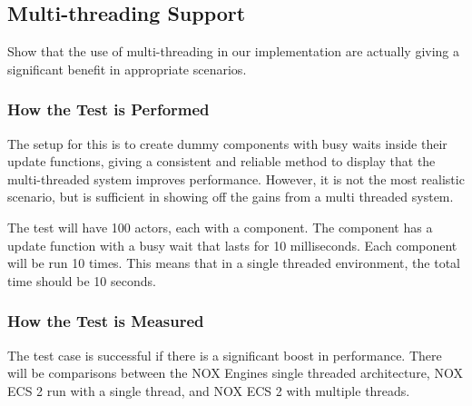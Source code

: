 \subsection{Multi-threading Support}
Show that the use of multi-threading in our implementation are actually giving a significant benefit in appropriate scenarios.

\subsubsection*{How the Test is Performed}
The setup for this is to create dummy components with busy waits inside their update functions, giving a consistent and reliable method to display that the multi-threaded system improves performance.
 However, it is not the most realistic scenario, but is sufficient in showing off the gains from a multi threaded system.

The test will have 100 actors, each with a component.
The component has a update function with a busy wait that lasts for 10 milliseconds.
Each component will be run 10 times.
This means that in a single threaded environment, the total time should be 10 seconds.

\subsubsection*{How the Test is Measured}
The test case is successful if there is a significant boost in performance.
There will be comparisons between the NOX Engines single threaded architecture, NOX ECS 2 run with a single thread, and NOX ECS 2 with multiple threads.
